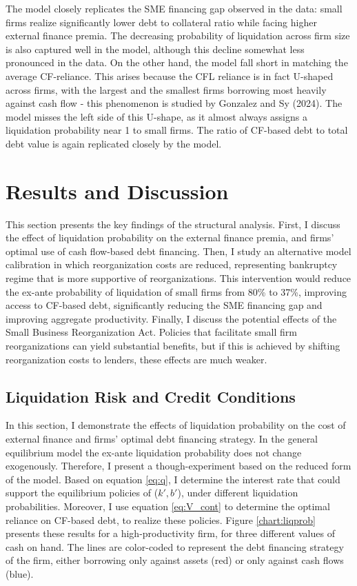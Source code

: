 \documentclass[12pt]{article}
\begin{document}
\noindent The model closely replicates the SME financing gap observed in the data: small firms realize significantly lower debt to collateral ratio while facing higher external finance premia. The decreasing probability of liquidation across firm size is also captured well in the model, although this decline somewhat less pronounced in the data. On the other hand, the model fall short in matching the average CF-reliance. This arises because the CFL reliance is in fact U-shaped across firms, with the largest and the smallest firms borrowing most heavily against cash flow - this phenomenon is studied by Gonzalez and Sy (2024). The model misses the left side of this U-shape, as it almost always assigns a liquidation probability near 1 to small firms. The ratio of CF-based debt to total debt value is again replicated closely by the model. 


\section{Results and Discussion}

This section presents the key findings of the structural analysis. First, I discuss the effect of liquidation probability on the external finance premia, and firms' optimal use of cash flow-based debt financing. Then, I study an alternative model calibration in which reorganization costs are reduced, representing bankruptcy regime that is more supportive of reorganizations. This intervention would reduce the ex-ante probability of liquidation of small firms from 80\% to 37\%,  improving access to CF-based debt, significantly reducing the SME financing gap and improving aggregate productivity. Finally, I discuss the potential effects of the Small Business Reorganization Act. Policies that facilitate small firm reorganizations can yield substantial benefits, but if this is achieved by shifting reorganization costs to lenders, these effects are much weaker. 

\subsection{Liquidation Risk and Credit Conditions}

In this section, I demonstrate the effects of liquidation probability on the cost of external finance and firms' optimal debt financing strategy. In the general equilibrium model the ex-ante liquidation probability does not change exogenously. Therefore, I present a though-experiment based on the reduced form of the model. Based on equation \ref{eq:q}, I determine the interest rate that could support the equilibrium policies of ($k',b'$), under different liquidation probabilities. Moreover, I use equation \ref{eq:V_cont} to determine the optimal reliance on CF-based debt, to realize these policies. Figure \ref{chart:liqprob} presents these results for a high-productivity firm, for three different values of cash on hand. The lines are color-coded to represent the debt financing strategy of the firm, either borrowing only against assets (red) or only against cash flows (blue). \\
\end{document}
